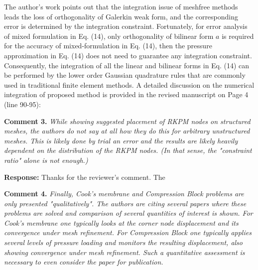 \documentclass{article}
\begin{document}
The author's work \cite{} points out that the integration issue of meshfree methods leads the loss of orthogonality of Galerkin weak form, and the corresponding error is determined by the integration constraint.
Fortunately, for error analysis of mixed formulation in Eq. (14), only orthogonality of bilinear form $a$ is required for the accuracy of mixed-formulation in Eq. (14), then the pressure approximation in Eq. (14) does not need to guarantee any integration constraint. 
Consequently, the integration of all the linear and bilinear forms in Eq. (14) can be performed by the lower order Gaussian quadrature rules that are commonly used in traditional finite element methods. 
A detailed discussion on the numerical integration of proposed method is provided in the revised manuscript on Page 4 (line 90-95):
\begin{quote}
\end{quote}

\textbf{Comment 3.} \textit{While showing suggested placement of RKPM nodes on structured meshes, the authors do not say at all how they do this for arbitrary unstructured meshes. This is likely done by trial an error and the results are likely heavily dependent on the distribution of the RKPM nodes. (In that sense, the "constraint ratio" alone is not enough.)}

\textbf{Response:} Thanks for the reviewer's comment.
The 

\textbf{Comment 4.} \textit{Finally, Cook's membrane and Compression Block problems are only presented "qualitatively". The authors are citing several papers where these problems are solved and comparison of several quantities of interest is shown. For Cook's membrane one typically looks at the corner node displacement and its convergence under mesh refinement. For Compression Block one typically applies several levels of pressure loading and monitors the resulting displacement, also showing convergence under mesh refinement. Such a quantitative assessment is necessary to even consider the paper for publication.}



\end{document}
